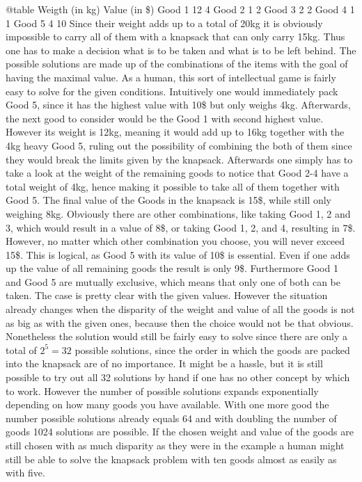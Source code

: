 \documentclass[11pt,a4paper]{article}
\begin{document}
@table
    Weigth (in kg)    Value (in \$)
Good 1    12    4
Good 2    1    2
Good 3    2    2
Good 4    1    1
Good 5    4    10
Since their weight adds up to a total of 20kg it is obviously impossible to carry all of them with a knapsack that can only carry 15kg. Thus one has to make a decision what is to be taken and what is to be left behind.
The possible solutions are made up of the combinations of the items with the goal of having the maximal value.
As a human, this sort of intellectual game is fairly easy to solve for the given conditions. Intuitively one would immediately pack Good 5, since it has the highest value with 10\$ but only weighs 4kg. Afterwards, the next good to consider would be the Good 1 with second highest value. However its weight is 12kg, meaning it would add up to 16kg together with the 4kg heavy Good 5, ruling out the possibility of combining the both of them since they would break the limits given by the knapsack.
Afterwards one simply has to take a look at the weight of the remaining goods to notice that Good 2-4 have a total weight of 4kg, hence making it possible to take all of them together with Good 5. The final value of the Goods in the knapsack is 15\$, while still only weighing 8kg.
Obviously there are other combinations, like taking Good 1, 2 and 3, which would result in a value of 8\$, or taking Good 1, 2, and 4, resulting in 7\$. However, no matter which other combination you choose, you will never exceed 15\$.
This is logical, as Good 5 with its value of 10\$ is essential. Even if one adds up the value of all remaining goods the result is only 9\$. Furthermore Good 1 and Good 5 are mutually exclusive, which means that only one of both can be taken. The case is pretty clear with the given values.
However the situation already changes when the disparity of the weight and value of all the goods is not as big as with the given ones, because then the choice would not be that obvious. Nonetheless the solution would still be fairly easy to solve since there are only a total of $2^5=32$ possible solutions, since the order in which the goods are packed into the knapsack are of no importance. It might be a hassle, but it is still possible to try out all 32 solutions by hand if one has no other concept by which to work.
However the number of possible solutions expands exponentially depending on how many goods you have available. With one more good the number possible solutions already equals 64 and with doubling the number of goods 1024 solutions are possible. If the chosen weight and value of the goods are still chosen with as much disparity as they were in the example a human might still be able to solve the knapsack problem with ten goods almost as easily as with five.
\end{document}

